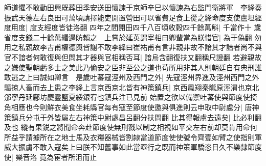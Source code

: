 師道懼不敢動田興既葬田季安送田懷諫于京師辛巳以懷諫為右監門衛將軍　李絳奏振武天德左右良田可萬頃請擇能吏開置營田可以省費足食上從之絳命度支使盧坦經度用度|{
	度支經度皆徒洛翻}
四年之間開田四千八百頃收穀四千餘萬斛|{
	千當作十}
歲省度支錢二十餘萬緡邊防賴之　上嘗於延英謂宰相曰卿輩當為朕惜官|{
	為于偽翻}
勿用之私親故李吉甫權德輿皆謝不敢李絳曰崔祐甫有言非親非故不諳其才諳者尚不與官不諳者何敢復與但問其才器與官相稱否耳|{
	諳烏含翻復扶又翻稱尺證翻}
若避親故之嫌使聖朝虧多士之美此乃偷安之臣非至公之道也苟所用非其人則朝廷自有典刑誰敢逃之上曰誠如卿言　是歲吐蕃寇涇州及西門之外|{
	先寇涇州界進及涇州西門之外}
驅掠人畜而去上患之李絳上言京西京北皆有神策鎮兵|{
	京西鳳翔秦隴原涇渭也京北邠寧丹延鄜坊慶靈鹽夏綏銀宥也鎮兵注已見前}
始置之欲以備禦吐蕃使與節度使掎角相應也今則鮮衣美食坐耗縣官每有寇至節度使邀與俱進則云申取中尉處分|{
	唐神策鎮兵分屯于外皆屬左右神策中尉處昌呂翻分扶問翻}
比其得報虜去遠矣|{
	比必利翻及也}
縱有果鋭之將聞命奔赴節度使無刑戮以制之相視如平交左右前却莫肯用命何所益乎請據所在之地士馬及衣糧器械皆割隸當道節度使使號令齊壹如臂之使指則軍威大振虜不敢入寇矣上曰朕不知舊事如此當亟行之既而神策軍驕恣日久不樂隸節度使|{
	樂音洛}
竟為宦者所沮而止

